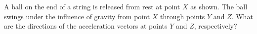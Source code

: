 \documentclass{../../oss-apphys-exam}
\begin{document}
\begin{multicols*}{2}
\begin{questions}
%
%    
    
    

    \question A ball on the end of a string is released from rest at point $X$
    as shown. The ball swings under the influence of gravity from point $X$
    through points $Y$ and $Z$. What are the directions of the acceleration
    vectors at points $Y$ and $Z$, respectively?
    

\end{questions}
\end{multicols*}
\end{document}

